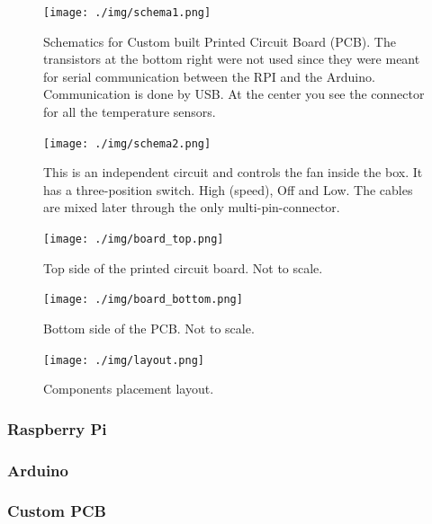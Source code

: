 \documentclass[master,       %
               twoside,        %
               BCOR10mm,       %
               ngerman,english  %
               ]{GAUBM_astro}
\begin{document}
\begin{figure}[h!]
 \centering
 \texttt{[image: ./img/schema1.png]}
 \caption{Schematics for Custom built Printed Circuit Board (PCB). The transistors at the bottom right were not used since they were meant for 
 serial communication between the RPI and the Arduino. Communication is done by USB. At the center you see the connector for all the temperature sensors.}
 \label{fig:schema1}
\end{figure}


\begin{figure}[h!]
 \centering
 \texttt{[image: ./img/schema2.png]}
 \caption{This is an independent circuit and controls the fan inside the box. It has a three-position switch. High (speed), Off and Low.
 The cables are mixed later through the only multi-pin-connector.}
 \label{fig:schema2}
\end{figure}


\begin{figure}[h!]
 \centering
 \texttt{[image: ./img/board\_top.png]}
 \caption{Top side of the printed circuit board. Not to scale.}
 \label{fig:board_top}
\end{figure}

\begin{figure}[h!]
 \centering
 \texttt{[image: ./img/board\_bottom.png]}
 \caption{Bottom side of the PCB. Not to scale.}
 \label{fig:board_bottom}
\end{figure}



\begin{figure}[h!]
 \centering
 \texttt{[image: ./img/layout.png]}
 \caption{Components placement layout.}
 \label{fig:layout}
\end{figure}


\subsubsection{Raspberry Pi}
\subsubsection{Arduino}
\subsubsection{Custom PCB}
\end{document}
